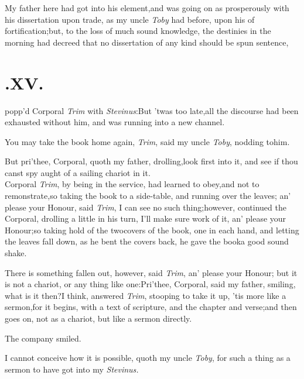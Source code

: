 \documentclass{article}
\begin{document}
My father here had got into his element,\tsh and was going on
as pros\-per\-ously with his dissertation upon trade, as my uncle
\textit{Toby} had before, upon his\break 
of fortification;\tsh but, to the loss\break
of much sound knowledge, the destinies in the morning had
decreed that no
dissertation of any kind should be spun
\break sentence,

\medskip

\section{.\enspace  XV.}

 popp’d Corporal \textit{Trim} with
\textit{Stevinus}:\tsk But ’twas too late,\tsk all the\break
discourse had been exhausted without him, and was running into a
new channel.

\tsk You may take the book home again, \textit{Trim}, said my
uncle \textit{Toby}, nodding to\break him.

But pri’thee, Corporal, quoth my father, drolling,\tsk look
first into it, and see if thou canst spy aught of a
sailing\break
chariot in it.\\
\newpage
Corporal \textit{Trim}, by being in the service, had learned to
obey,\tsk and not to remonstrate,\tsk so taking the book to a
side-table, and running over the leaves; an’ please your
Honour, said \textit{Trim}, I can see no such thing;\tsk however,
continued the Corporal, drolling a little in his turn, I’ll
make sure work of it, an’ please your Honour;\tsk so taking
hold of the two\break covers of the book, one in each hand, and letting
the leaves fall down, as he bent the covers back, he gave the
book\break a good sound shake.

There is something fallen out, however, said \textit{Trim},
an’ please your Honour; but it is not a chariot, or any
thing like one:\tsk Pri’thee, Corporal, said my father, smiling,
what is it then?\tsk I think, answered \textit{Trim}, stooping to
take it up,\tsk\break  
’tis more like a sermon,\tsk for it begins,
with a text of scripture, and
the chapter and verse;\tsk and then goes on, not as a chariot,
but like a sermon directly.

The company smiled.

I cannot conceive how it is possible, quoth my uncle
\textit{Toby}, for such a thing as a sermon to have got into my
\textit{Stevinus.}
\end{document}
